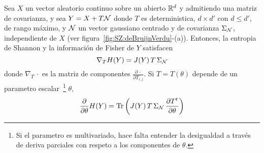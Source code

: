 \begin{teorema}
  Sea $X$ un  vector aleatorio continuo sobre un  abierto $\mathbb{R}^d$ y admitiendo
  una  matriz  de  covarianza,  y  sea  $Y   =  X  +  T  \mathcal{N}$  donde  $T$  es
  deterministica, $d \times  d'$ con $ d \le d'$, de  rango m\'aximo, y $\mathcal{N}$
  un vector gaussiano centrado y de covarianza $\Sigma_{\mathcal{N}}$, independiente de
  $X$  (ver  figura~\ref{fig:SZ:deBruijnVerdu}-(a)).  Entonces, la  entropia  de
  Shannon y la informaci\'on de Fisher  de $Y$ satisfacen
  \[
  \nabla_T H(Y) = J(Y) \, T \, \Sigma_{\mathcal{N}}
  \]
  donde  $\nabla_T \,  \cdot$ es  la  matriz de  componentes $\frac{\partial  \,
    \cdot}{\partial  T_{i,j}}$.  Si  $T  = T(\theta)$  depende  de un  parametro
  escalar~\footnote{Si  el parametro  es  multivariado, hace  falta entender  la
    desigualdad a trav\'es de deriva  parciales con respeto a los componentes de
    $\theta$.}   $\theta$,
  \[
  \frac{\partial}{\partial \theta}  H(Y) = \operatorname{Tr}\left( J(Y) \,  T \, \Sigma_{\mathcal{N}}
    \, \frac{\partial T^t}{\partial \theta} \right)
  \]
\end{teorema}
%
